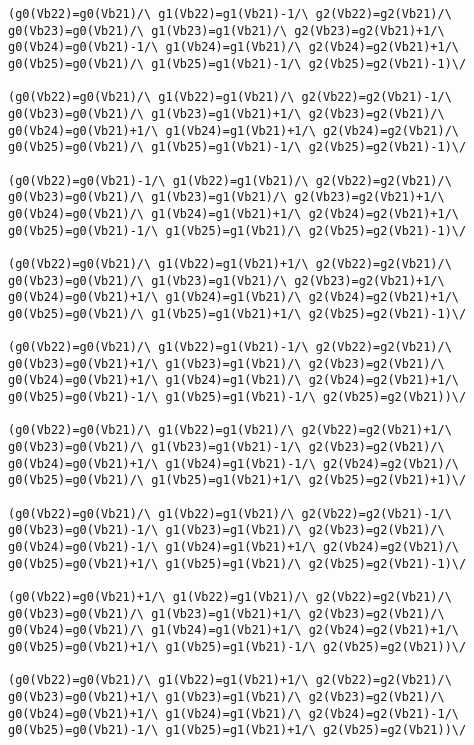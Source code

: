 \begin{appendices}
\begin{lstlisting}
(g0(Vb22)=g0(Vb21)/\ g1(Vb22)=g1(Vb21)-1/\ g2(Vb22)=g2(Vb21)/\ g0(Vb23)=g0(Vb21)/\ g1(Vb23)=g1(Vb21)/\ g2(Vb23)=g2(Vb21)+1/\ g0(Vb24)=g0(Vb21)-1/\ g1(Vb24)=g1(Vb21)/\ g2(Vb24)=g2(Vb21)+1/\ g0(Vb25)=g0(Vb21)/\ g1(Vb25)=g1(Vb21)-1/\ g2(Vb25)=g2(Vb21)-1)\/ 

(g0(Vb22)=g0(Vb21)/\ g1(Vb22)=g1(Vb21)/\ g2(Vb22)=g2(Vb21)-1/\ g0(Vb23)=g0(Vb21)/\ g1(Vb23)=g1(Vb21)+1/\ g2(Vb23)=g2(Vb21)/\ g0(Vb24)=g0(Vb21)+1/\ g1(Vb24)=g1(Vb21)+1/\ g2(Vb24)=g2(Vb21)/\ g0(Vb25)=g0(Vb21)/\ g1(Vb25)=g1(Vb21)-1/\ g2(Vb25)=g2(Vb21)-1)\/ 

(g0(Vb22)=g0(Vb21)-1/\ g1(Vb22)=g1(Vb21)/\ g2(Vb22)=g2(Vb21)/\ g0(Vb23)=g0(Vb21)/\ g1(Vb23)=g1(Vb21)/\ g2(Vb23)=g2(Vb21)+1/\ g0(Vb24)=g0(Vb21)/\ g1(Vb24)=g1(Vb21)+1/\ g2(Vb24)=g2(Vb21)+1/\ g0(Vb25)=g0(Vb21)-1/\ g1(Vb25)=g1(Vb21)/\ g2(Vb25)=g2(Vb21)-1)\/ 

(g0(Vb22)=g0(Vb21)/\ g1(Vb22)=g1(Vb21)+1/\ g2(Vb22)=g2(Vb21)/\ g0(Vb23)=g0(Vb21)/\ g1(Vb23)=g1(Vb21)/\ g2(Vb23)=g2(Vb21)+1/\ g0(Vb24)=g0(Vb21)+1/\ g1(Vb24)=g1(Vb21)/\ g2(Vb24)=g2(Vb21)+1/\ g0(Vb25)=g0(Vb21)/\ g1(Vb25)=g1(Vb21)+1/\ g2(Vb25)=g2(Vb21)-1)\/ 

(g0(Vb22)=g0(Vb21)/\ g1(Vb22)=g1(Vb21)-1/\ g2(Vb22)=g2(Vb21)/\ g0(Vb23)=g0(Vb21)+1/\ g1(Vb23)=g1(Vb21)/\ g2(Vb23)=g2(Vb21)/\ g0(Vb24)=g0(Vb21)+1/\ g1(Vb24)=g1(Vb21)/\ g2(Vb24)=g2(Vb21)+1/\ g0(Vb25)=g0(Vb21)-1/\ g1(Vb25)=g1(Vb21)-1/\ g2(Vb25)=g2(Vb21))\/ 

(g0(Vb22)=g0(Vb21)/\ g1(Vb22)=g1(Vb21)/\ g2(Vb22)=g2(Vb21)+1/\ g0(Vb23)=g0(Vb21)/\ g1(Vb23)=g1(Vb21)-1/\ g2(Vb23)=g2(Vb21)/\ g0(Vb24)=g0(Vb21)+1/\ g1(Vb24)=g1(Vb21)-1/\ g2(Vb24)=g2(Vb21)/\ g0(Vb25)=g0(Vb21)/\ g1(Vb25)=g1(Vb21)+1/\ g2(Vb25)=g2(Vb21)+1)\/ 

(g0(Vb22)=g0(Vb21)/\ g1(Vb22)=g1(Vb21)/\ g2(Vb22)=g2(Vb21)-1/\ g0(Vb23)=g0(Vb21)-1/\ g1(Vb23)=g1(Vb21)/\ g2(Vb23)=g2(Vb21)/\ g0(Vb24)=g0(Vb21)-1/\ g1(Vb24)=g1(Vb21)+1/\ g2(Vb24)=g2(Vb21)/\ g0(Vb25)=g0(Vb21)+1/\ g1(Vb25)=g1(Vb21)/\ g2(Vb25)=g2(Vb21)-1)\/ 

(g0(Vb22)=g0(Vb21)+1/\ g1(Vb22)=g1(Vb21)/\ g2(Vb22)=g2(Vb21)/\ g0(Vb23)=g0(Vb21)/\ g1(Vb23)=g1(Vb21)+1/\ g2(Vb23)=g2(Vb21)/\ g0(Vb24)=g0(Vb21)/\ g1(Vb24)=g1(Vb21)+1/\ g2(Vb24)=g2(Vb21)+1/\ g0(Vb25)=g0(Vb21)+1/\ g1(Vb25)=g1(Vb21)-1/\ g2(Vb25)=g2(Vb21))\/ 

(g0(Vb22)=g0(Vb21)/\ g1(Vb22)=g1(Vb21)+1/\ g2(Vb22)=g2(Vb21)/\ g0(Vb23)=g0(Vb21)+1/\ g1(Vb23)=g1(Vb21)/\ g2(Vb23)=g2(Vb21)/\ g0(Vb24)=g0(Vb21)+1/\ g1(Vb24)=g1(Vb21)/\ g2(Vb24)=g2(Vb21)-1/\ g0(Vb25)=g0(Vb21)-1/\ g1(Vb25)=g1(Vb21)+1/\ g2(Vb25)=g2(Vb21))\/ 


\end{lstlisting}
\end{appendices}
